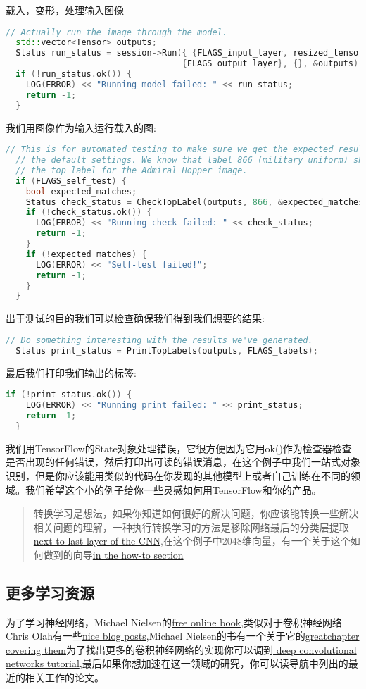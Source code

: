 载入，变形，处理输入图像
\begin{lstlisting}[language=C++]
  // Actually run the image through the model.
  std::vector<Tensor> outputs;
  Status run_status = session->Run({ {FLAGS_input_layer, resized_tensor}},
                                   {FLAGS_output_layer}, {}, &outputs);
  if (!run_status.ok()) {
    LOG(ERROR) << "Running model failed: " << run_status;
    return -1;
  }
\end{lstlisting}
我们用图像作为输入运行载入的图:
\begin{lstlisting}[language=C++]
  // This is for automated testing to make sure we get the expected result with
  // the default settings. We know that label 866 (military uniform) should be
  // the top label for the Admiral Hopper image.
  if (FLAGS_self_test) {
    bool expected_matches;
    Status check_status = CheckTopLabel(outputs, 866, &expected_matches);
    if (!check_status.ok()) {
      LOG(ERROR) << "Running check failed: " << check_status;
      return -1;
    }
    if (!expected_matches) {
      LOG(ERROR) << "Self-test failed!";
      return -1;
    }
  }
\end{lstlisting}
出于测试的目的我们可以检查确保我们得到我们想要的结果:
\begin{lstlisting}[language=C++]
// Do something interesting with the results we've generated.
  Status print_status = PrintTopLabels(outputs, FLAGS_labels);
\end{lstlisting}
最后我们打印我们输出的标签:
\begin{lstlisting}[language=C++]
 if (!print_status.ok()) {
    LOG(ERROR) << "Running print failed: " << print_status;
    return -1;
  }
\end{lstlisting}
我们用TensorFlow的State对象处理错误，它很方便因为它用ok()作为检查器检查是否出现的任何错误，然后打印出可读的错误消息，在这个例子中我们一站式对象识别，但是你应该能用类似的代码在你发现的其他模型上或者自己训练在不同的领域。我们希望这个小的例子给你一些灵感如何用TensorFlow和你的产品。
\begin{quote}
转换学习是想法，如果你知道如何很好的解决问题，你应该能转换一些解决相关问题的理解，一种执行转换学习的方法是移除网络最后的分类层提取\href{http://arxiv.org/abs/1310.1531}{next-to-last layer of the CNN},在这个例子中2048维向量，有一个关于这个如何做到的向导\href{https://www.tensorflow.org/tutorials/image_retraining}{in the how-to section}
\end{quote}
\subsection{更多学习资源}
为了学习神经网络，Michael Nielsen的\href{http://neuralnetworksanddeeplearning.com/chap1.html}{free online book},类似对于卷积神经网络Chris Olah有一些\href{http://colah.github.io/posts/2014-07-Conv-Nets-Modular/}{nice blog posts},Michael Nielsen的书有一个关于它的\href{http://neuralnetworksanddeeplearning.com/chap6.html}{greatchapter covering them}为了找出更多的卷积神经网络的实现你可以调到\href{https://www.tensorflow.org/tutorials/deep_cnn}{ deep convolutional networks tutorial},最后如果你想加速在这一领域的研究，你可以读导航中列出的最近的相关工作的论文。

